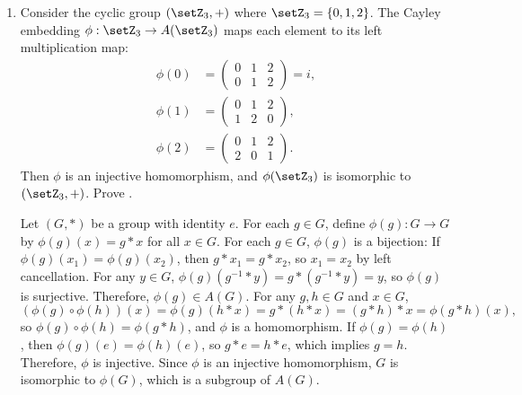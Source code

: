 \begin{enumerate}
\begin{enumerate}
\begin{subprove}
      Since $\phi$ is a bijection and preserves the group operation,
      it is concluded by definition of  that $(G, *)$ and $(G, \circ)$ are isomorphic.
    \end{subprove}
  \end{enumerate}




  \newpage
  
  \begin{define}{Cayley's Theorem}[def:cayley-theorem][red]
    Every  \((G, *)\) is isomorphic to a subgroup of the  on \(G\).
    That is, there exists an injective homomorphism \(\phi: G \to A(G)\).
  \end{define}
  \item Consider the cyclic group \((\setZ_3, +)\) where \(\setZ_3 = \{0, 1, 2\}\).
  The Cayley embedding \(\phi: \setZ_3 \to A(\setZ_3)\) maps each 
  element to its left multiplication map:
  \begin{align*}
    \phi(0) &= \begin{pmatrix} 0 & 1 & 2 \\ 0 & 1 & 2 \end{pmatrix} = i, \\
    \phi(1) &= \begin{pmatrix} 0 & 1 & 2 \\ 1 & 2 & 0 \end{pmatrix}, \\
    \phi(2) &= \begin{pmatrix} 0 & 1 & 2 \\ 2 & 0 & 1 \end{pmatrix}.
  \end{align*}
  Then \(\phi\) is an injective homomorphism, and \(\phi(\setZ_3)\) is 
  isomorphic to \((\setZ_3, +)\).
  Prove .
  \begin{subprove}
    Let \((G, *)\) be a group with identity \(e\). For each \(g \in G\), 
    define \(\phi(g): G \to G\) by \(\phi(g)(x) = g * x\) for all \(x \in G\).\proofstep
    For each \(g \in G\), \(\phi(g)\) is a bijection:
    If \(\phi(g)(x_1) = \phi(g)(x_2)\), then \(g * x_1 = g * x_2\), so \(x_1 = x_2\) by left cancellation.
    For any \(y \in G\), \(\phi(g)(g^{-1} * y) = g * (g^{-1} * y) = y\), so \(\phi(g)\) is surjective.
    Therefore, \(\phi(g) \in A(G)\).\proofstep
    For any \(g, h \in G\) and \(x \in G\),
    \[
    (\phi(g) \circ \phi(h))(x) = \phi(g)(h * x) = g * (h * x) = (g * h) * x = \phi(g * h)(x),
    \]
    so \(\phi(g) \circ \phi(h) = \phi(g * h)\), and \(\phi\) is a homomorphism.\proofstep
    If \(\phi(g) = \phi(h)\), then \(\phi(g)(e) = \phi(h)(e)\), 
    so \(g * e = h * e\), which implies \(g = h\).
    Therefore, \(\phi\) is injective.
    Since \(\phi\) is an injective homomorphism, \(G\) is isomorphic 
    to \(\phi(G)\), which is a subgroup of \(A(G)\).
  \end{subprove}






\end{enumerate}
